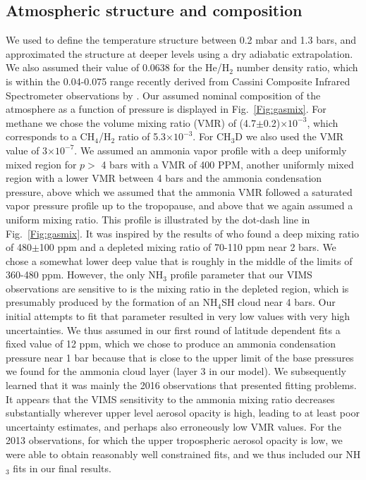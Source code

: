 \documentclass[article,11pt]{emulateapj}
\def\chfx{CH$_4$}
\def\chtd{CH$_3$D }
\def\nht{NH$_3$ }
\def\nhfsh{NH$_4$SH }
\begin{document}
\subsection{Atmospheric structure and composition}
We used \cite{Lindal1985} to define the temperature structure between
0.2 mbar and 1.3 bars, and approximated the structure at deeper levels
using a dry adiabatic extrapolation. We also assumed their value of
0.0638 for the He/H$_2$ number density ratio, which is within the
0.04-0.075 range recently derived from Cassini Composite Infrared
Spectrometer observations by \cite{Achterberg2020}.  Our assumed
nominal composition of the atmosphere as a function of pressure is
displayed in Fig.\ \ref{Fig:gasmix}.  For methane we chose the
\cite{Fletcher2009ch4saturn} volume mixing ratio (VMR) of
(4.7$\pm$0.2)$\times 10^{-3}$, which corresponds to a \chfx/H$_2$
ratio of 5.3$\times 10^{-3}$.  For \chtd we also used the
\cite{Fletcher2009ch4saturn} VMR value of 3$\times 10^{-7}$.  We
assumed an ammonia vapor profile with a deep uniformly mixed region
for $p >$ 4 bars with a VMR of 400 PPM, another uniformly mixed region
with a lower VMR between 4 bars and the ammonia condensation pressure,
above which we assumed that the ammonia VMR followed a saturated vapor
pressure profile up to the tropopause, and above that we again assumed
a uniform mixing ratio.  This profile is illustrated by the dot-dash
line in Fig.\ \ref{Fig:gasmix}.  It was inspired by the results of
\cite{Briggs1989} who found a deep mixing ratio of 480$\pm$100 ppm and
a depleted mixing ratio of 70-110 ppm near 2 bars.  We chose a
somewhat lower deep value that is roughly in the middle of the
\cite{Laraia2013} limits of 360-480 ppm.  However, the only \nht
profile parameter that our VIMS observations are sensitive to is the
mixing ratio in the depleted region, which is presumably produced by
the formation of an \nhfsh cloud near 4 bars.  Our initial attempts to
fit that parameter resulted in very low values with very high
uncertainties.  We thus assumed in our first round of latitude
dependent fits a fixed value of 12 ppm, which we chose to produce an
ammonia condensation pressure near 1 bar because that is close to the
upper limit of the base pressures we found for the ammonia cloud layer
(layer 3 in our model).  We subsequently learned that it was mainly
the 2016 observations that presented fitting problems. It appears that
the VIMS sensitivity to the ammonia mixing ratio decreases
substantially wherever upper level aerosol opacity is high, leading to
at least poor uncertainty estimates, and perhaps also erroneously low
VMR values. For the 2013 observations, for which the upper
tropospheric aerosol opacity is low, we were able to obtain reasonably
well constrained fits, and we thus included our \nht fits in our final
results.
\end{document}
